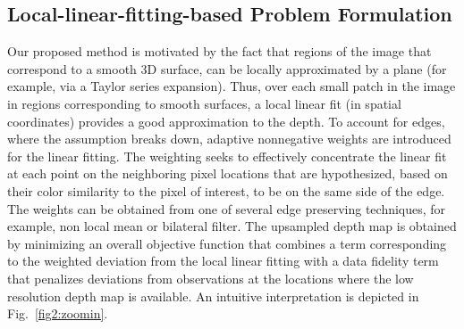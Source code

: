 \subsection{Local-linear-fitting-based Problem Formulation}
\label{sec2.3.1}
Our proposed method is motivated by the fact that regions of the image that correspond to a smooth 3D surface, can be locally approximated by a plane (for example, via a Taylor series expansion). Thus, over each small patch in the image in regions corresponding to smooth surfaces, a local linear fit (in spatial coordinates) provides a good approximation to the depth. To account for edges, where the assumption breaks down, adaptive nonnegative weights are introduced for the linear fitting. The weighting seeks to  effectively concentrate the linear fit at each point on the neighboring pixel locations that are hypothesized, based on their color similarity to the pixel of interest, to be on the same side of the edge. The weights can be obtained from one of several edge preserving techniques, for example, non local mean or bilateral filter. The upsampled depth map is obtained by minimizing an overall objective function that combines a term corresponding to the weighted deviation from the local linear fitting with a data fidelity term that penalizes deviations from observations at the locations where the low resolution depth map is available. An intuitive interpretation is depicted in Fig.~\ref{fig2:zoomin}.

